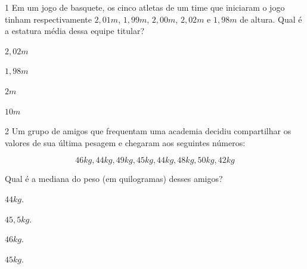 {{{\num{1} Em um jogo de basquete, os cinco atletas de um time que iniciaram o jogo
tinham respectivamente $2,01 m$, $1,99 m$, $2,00 m$, $2,02 m$ e $1,98 m$ de
altura. Qual é a estatura média dessa equipe titular?

\begin{escolha}[itemsep=0pt]
\item $2,02 m$
\item $1,98 m$
\item $2 m$
\item $10 m$
\end{escolha}











\num{2} Um grupo de amigos que frequentam uma academia decidiu compartilhar os
valores de sua última pesagem e chegaram aos seguintes números:

$$46 kg, 44 kg, 49 kg, 45 kg, 44 kg, 48 kg, 50 kg, 42 kg$$

Qual é a mediana do peso (em quilogramas) desses amigos?

\begin{escolha}[itemsep=0pt]
\item $44 kg$.
\item $45,5 kg$.
\item $46 kg$.
\item $45 kg$.
\end{escolha}


}}}
